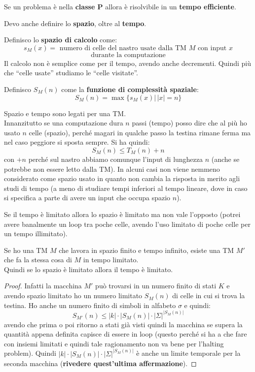 \begin{teorema}
  Se un problema è nella \textbf{classe P} allora è risolvibile in un
  \textbf{tempo efficiente}.
\end{teorema}
Devo anche definire lo \textbf{spazio}, oltre al \textbf{tempo}.\\
\begin{definizione}
  Definisco lo \textbf{spazio di calcolo} come:
  \[s_M(x)=\mbox{ numero di celle del nastro usate dalla TM $M$ con input $x$}\]
  \[\mbox{durante la computazione}\]
  Il calcolo non è semplice come per il tempo, avendo anche decrementi. Quindi
  più che ``celle usate'' studiamo le ``celle visitate''.
\end{definizione}
\begin{definizione}
  Definisco $S_M(n)$ come la \textbf{funzione di complessità spaziale}:
  \[S_M(n)=\max\{s_M(x)|\,|x|=n\}\]
\end{definizione}
Spazio e tempo sono legati per una TM.\\
Innanzitutto se una computazione dura $n$ passi (tempo) posso dire che al più ho
usato $n$ celle (spazio), perché magari in qualche passo la testina rimane ferma
ma nel caso peggiore si sposta sempre. Si ha quindi:
\[S_M(n)\leq T_M(n)+n\]
con $+n$ perché sul nastro abbiamo comunque l'input di lunghezza $n$ (anche se
potrebbe non essere letto dalla TM). In alcuni casi non viene nemmeno
considerato come spazio usato in quanto non cambia la risposta in merito agli
studi di tempo (a meno di studiare tempi inferiori al tempo lineare, dove in
caso si specifica a parte di avere un input che occupa spazio $n$).
\begin{teorema}
  Se il tempo è limitato allora lo spazio è limitato ma non vale l'opposto
  (potrei avere banalmente un loop tra poche celle, avendo l'uso limitato di
  poche celle per un tempo illimitato).
\end{teorema}
\begin{teorema}
  Se ho una TM $M$ che lavora in spazio finito e tempo infinito, esiste una TM
  $M'$ che fa la stessa cosa di $M$ in tempo limitato.\\
  Quindi se lo spazio è limitato allora il tempo è limitato.
\end{teorema}
\begin{proof}
  Infatti la macchina $M'$ può trovarsi in un numero finito di stati $K$ e
  avendo spazio limitato ho un numero limitato $S_M(n)$ di celle in cui si trova
  la testina. Ho anche un numero finito di simboli in alfabeto $\sigma$ e
  quindi: 
  \[S_{M'}(n)\leq|k|\cdot |S_M(n)|\cdot |\Sigma|^{|S_M(n)|}\]
  avendo che prima o poi ritorno a stati già visti quindi la macchina se supera
  la quantità appena definita capisce di essere in loop (questo perché si ha a
  che fare con insiemi limitati e quindi tale ragionamento non va bene per
  l'halting problem). Quindi $|k|\cdot |S_M(n)|\cdot |\Sigma|^{|S_M(n)|}$ è
  anche un limite temporale per la seconda macchina (\textbf{rivedere
    quest'ultima affermazione}).
\end{proof}
